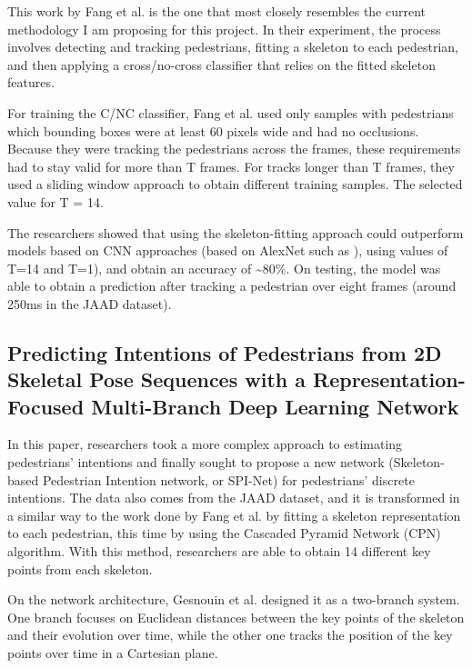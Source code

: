 \documentclass[conference, onecolumn]{IEEEtran}
\begin{document}
This work by Fang et al. is the one that most closely resembles the current methodology I am proposing for this project. In their experiment, the process involves detecting and tracking pedestrians, fitting a skeleton to each pedestrian, and then applying a cross/no-cross classifier that relies on the fitted skeleton features.

For training the C/NC classifier, Fang et al. used only samples with pedestrians which bounding boxes were at least 60 pixels wide and had no occlusions. Because they were tracking the pedestrians across the frames, these requirements had to stay valid for more than T frames. For tracks longer than T frames, they used a sliding window approach to obtain different training samples. The selected value for T = 14.

The researchers showed that using the skeleton-fitting approach could outperform models based on CNN approaches (based on AlexNet such as \cite{rasouli2017ICCVW}), using values of T=14 and T=1), and obtain an accuracy of \textasciitilde80\%. On testing, the model was able to obtain a prediction after tracking a pedestrian over eight frames (around 250ms in the JAAD dataset).

\subsection{Predicting Intentions of Pedestrians from 2D Skeletal Pose Sequences with a Representation-Focused Multi-Branch Deep Learning Network}\label{predicting-intentions-of-pedestrians-from-2d-skeletal-pose-sequences-with-a-representation-focused-multi-branch-deep-learning-network}

In this paper, researchers took a more complex approach to estimating pedestrians' intentions and finally sought to propose a new network (Skeleton-based Pedestrian Intention network, or SPI-Net) for pedestrians' discrete intentions. The data also comes from the JAAD dataset, and it is transformed in a similar way to the work done by Fang et al. by fitting a skeleton representation to each pedestrian, this time by using the Cascaded Pyramid Network (CPN) algorithm. With this method, researchers are able to obtain 14 different key points from each skeleton.

On the network architecture, Gesnouin et al. designed it as a two-branch system. One branch focuses on Euclidean distances between the key points of the skeleton and their evolution over time, while the other one tracks the position of the key points over time in a Cartesian plane.
\end{document}

